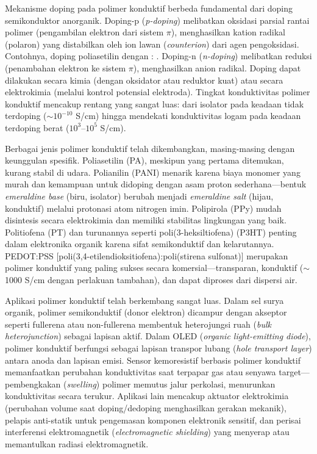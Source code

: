 \documentclass[12pt,a4paper,openany]{book}
\begin{document}
Mekanisme doping pada polimer konduktif berbeda fundamental dari doping semikonduktor anorganik. Doping-p (\textit{p-doping}) melibatkan oksidasi parsial rantai polimer (pengambilan elektron dari sistem $\pi$), menghasilkan kation radikal (polaron) yang distabilkan oleh ion lawan (\textit{counterion}) dari agen pengoksidasi. Contohnya, doping poliasetilin dengan : . Doping-n (\textit{n-doping}) melibatkan reduksi (penambahan elektron ke sistem $\pi$), menghasilkan anion radikal. Doping dapat dilakukan secara kimia (dengan oksidator atau reduktor kuat) atau secara elektrokimia (melalui kontrol potensial elektroda). Tingkat konduktivitas polimer konduktif mencakup rentang yang sangat luas: dari isolator pada keadaan tidak terdoping ($\sim 10^{-10}$ S/cm) hingga mendekati konduktivitas logam pada keadaan terdoping berat ($10^3$--$10^5$ S/cm).

Berbagai jenis polimer konduktif telah dikembangkan, masing-masing dengan keunggulan spesifik. Poliasetilin (PA), meskipun yang pertama ditemukan, kurang stabil di udara. Polianilin (PANI) menarik karena biaya monomer yang murah dan kemampuan untuk didoping dengan asam proton sederhana---bentuk \textit{emeraldine base} (biru, isolator) berubah menjadi \textit{emeraldine salt} (hijau, konduktif) melalui protonasi atom nitrogen imin. Polipirola (PPy) mudah disintesis secara elektrokimia dan memiliki stabilitas lingkungan yang baik. Politiofena (PT) dan turunannya seperti poli(3-heksiltiofena) (P3HT) penting dalam elektronika organik karena sifat semikonduktif dan kelarutannya. PEDOT:PSS [poli(3,4-etilendioksitiofena):poli(stirena sulfonat)] merupakan polimer konduktif yang paling sukses secara komersial---transparan, konduktif ($\sim$1000 S/cm dengan perlakuan tambahan), dan dapat diproses dari dispersi air.

Aplikasi polimer konduktif telah berkembang sangat luas. Dalam sel surya organik, polimer semikonduktif (donor elektron) dicampur dengan akseptor seperti fullerena atau non-fullerena membentuk heterojungsi ruah (\textit{bulk heterojunction}) sebagai lapisan aktif. Dalam OLED (\textit{organic light-emitting diode}), polimer konduktif berfungsi sebagai lapisan transpor lubang (\textit{hole transport layer}) antara anoda dan lapisan emisi. Sensor kemoresistif berbasis polimer konduktif memanfaatkan perubahan konduktivitas saat terpapar gas atau senyawa target---pembengkakan (\textit{swelling}) polimer memutus jalur perkolasi, menurunkan konduktivitas secara terukur. Aplikasi lain mencakup aktuator elektrokimia (perubahan volume saat doping/dedoping menghasilkan gerakan mekanik), pelapis anti-statik untuk pengemasan komponen elektronik sensitif, dan perisai interferensi elektromagnetik (\textit{electromagnetic shielding}) yang menyerap atau memantulkan radiasi elektromagnetik.
\end{document}
